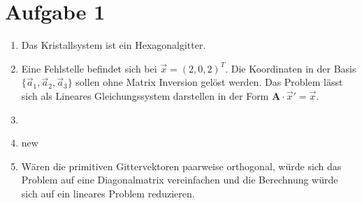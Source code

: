 \section*{Aufgabe 1}

\begin{enumerate}[label=\alph*)]

\item Das Kristallsystem ist ein Hexagonalgitter.

\item Eine Fehlstelle befindet sich bei $\vec x = (2,0,2)^T$. Die Koordinaten in der Basis $\{\vec a_1, \vec a_2, \vec a_3\}$ sollen ohne Matrix Inversion gelöst werden.
Das Problem lässt sich als Lineares Gleichungssystem darstellen in der Form $\mathbf{A} \cdot \vec x' = \vec x$.

\item 
\item new
\item Wären die primitiven Gittervektoren paarweise orthogonal, würde sich das Problem auf eine Diagonalmatrix vereinfachen und die Berechnung würde sich auf ein lineares Problem reduzieren.
\end{enumerate}

